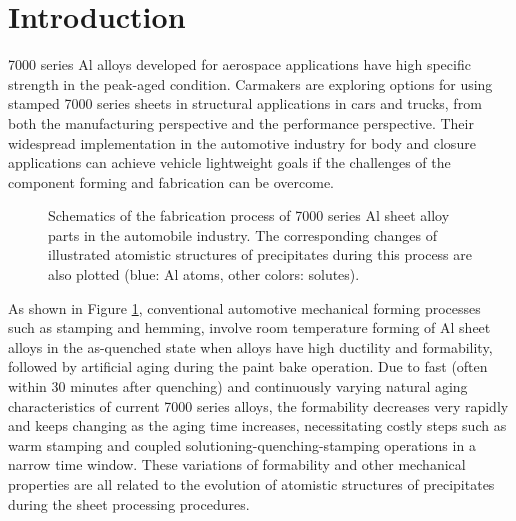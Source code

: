 \section{Introduction}
\label{Chap:Al/Vac:section:Intro}

7000 series Al alloys developed for aerospace applications have high specific strength in the peak-aged condition. Carmakers are exploring options for using stamped 7000 series sheets in structural applications in cars and trucks, from both the manufacturing perspective and the performance perspective. Their widespread implementation in the automotive industry for body and closure applications can achieve vehicle lightweight goals if the challenges of the component forming and fabrication can be overcome. \cite{fridlyander2002aluminum,hirsch2011aluminium,hirsch2014recent}

\begingroup
\begin{figure}[!ht]
  \centering
\caption[Schematics of the fabrication process of 7000 series Al sheet alloy parts in the automobile industry.]{Schematics of the fabrication process of 7000 series Al sheet alloy parts in the automobile industry. The corresponding changes of illustrated atomistic structures of precipitates during this process are also plotted (blue: Al atoms, other colors: solutes).}
  \label{Chap:Al/Vac:fig1}
\end{figure}
\endgroup

As shown in Figure \ref{Chap:Al/Vac:fig1}, conventional automotive mechanical forming processes such as stamping and hemming, involve room temperature forming of Al sheet alloys in the as-quenched state when alloys have high ductility and formability, followed by artificial aging during the paint bake operation. Due to fast (often within 30 minutes after quenching) and continuously varying natural aging characteristics of current 7000 series alloys, the formability decreases very rapidly and keeps changing as the aging time increases, necessitating costly steps such as warm stamping and coupled solutioning-quenching-stamping operations in a narrow time window. \cite{bryant1999effects,li2004biaxial} These variations of formability and other mechanical properties are all related to the evolution of atomistic structures of precipitates during the sheet processing procedures.

